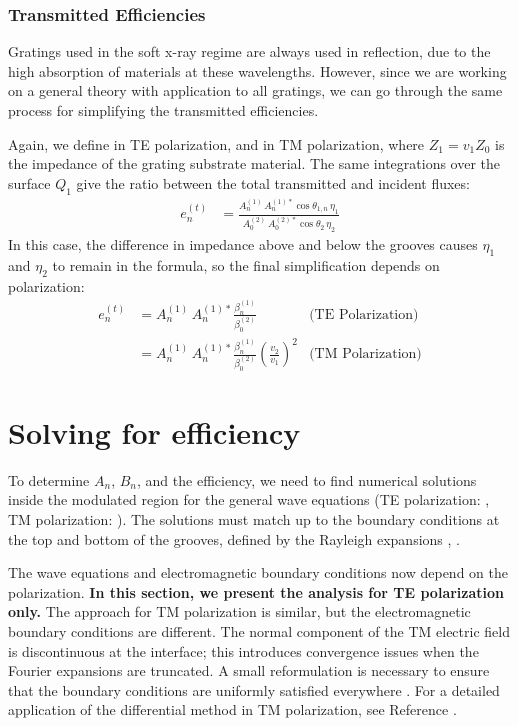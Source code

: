 \subsubsection{Transmitted Efficiencies}
Gratings used in the soft x-ray regime are always used in reflection, due to the high absorption of materials at these wavelengths.  However, since we are working on a general theory with application to all gratings, we can go through the same process for simplifying the transmitted efficiencies.  

Again, we define  in TE polarization, and  in TM polarization, where $Z_1 = v_1 Z_0$ is the impedance of the grating substrate material.  The same integrations over the surface $Q_1$ give the ratio between the total transmitted and incident fluxes:
\begin{align}
e_n^{(t)} &= \frac{    A_n^{(1)} \, A_n^{(1)\ast} \cos \theta_{1,n} \, \eta_1       }{    A_0^{(2)} \, A_0^{(2)\ast}  \cos \theta_{2} \,  \eta_2   }
\end{align}
In this case, the difference in impedance above and below the grooves causes $\eta_1$ and $\eta_2$ to remain in the formula, so the final simplification depends on polarization:
\begin{align}
\label{eqnEffT}
e_n^{(t)} &= A_n^{(1)} \, A_n^{(1)\ast} \frac{  \beta_n^{(1)}   } {  \beta_0^{(2)} }  & \textrm{(TE Polarization)} \\
&= A_n^{(1)} \, A_n^{(1)\ast} \frac{  \beta_n^{(1)}   } {  \beta_0^{(2)} }  \left( \frac{v_2}{v_1} \right)^2 & \textrm{(TM Polarization)}
\end{align}

\section{Solving for efficiency}
To determine $A_n$, $B_n$, and the efficiency, we need to find numerical solutions inside the modulated region for the general wave equations (TE polarization: , TM polarization: ). The solutions must match up to the boundary conditions at the top and bottom of the grooves, defined by the Rayleigh expansions , .

The wave equations and electromagnetic boundary conditions now depend on the polarization.  \textbf{In this section, we present the analysis for TE polarization only.}  The approach for TM polarization is similar, but the electromagnetic boundary conditions are different.  The normal component of the TM electric field is discontinuous at the interface; this introduces convergence issues when the Fourier expansions are truncated. A small reformulation is necessary to ensure that the boundary conditions are uniformly satisfied everywhere \cite{Li96b}.  For a detailed application of the differential method in TM polarization, see Reference \cite[Chapter 4]{Nev02}.

